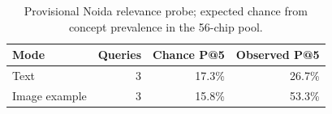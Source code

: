 \begin{table}[t]
\caption{Provisional Noida relevance probe; expected chance from concept prevalence in the 56-chip pool.}
\label{tab:retrieval}
\centering
\begin{tabular}{lrrr}
\hline
Mode & Queries & Chance P@5 & Observed P@5 \\
\hline
Text & 3 & 17.3\% & 26.7\% \\
Image example & 3 & 15.8\% & 53.3\% \\
\hline
\end{tabular}
\end{table}
